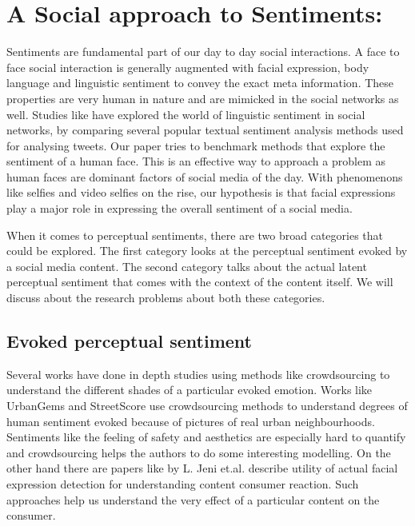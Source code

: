 \section{ A Social approach to Sentiments: }
Sentiments are fundamental part of our day to day social interactions. A face to face social interaction is generally augmented with facial expression, body language and linguistic sentiment to convey the exact meta information. These properties are very human in nature and are mimicked in the social networks as well. Studies like \cite{Joo2014b} have explored the world of linguistic sentiment in social networks, by comparing several popular textual sentiment analysis methods used for analysing tweets. Our paper tries to benchmark methods that explore the sentiment of a human face. This is an effective way to approach a problem as human faces are dominant factors of social media of the day. With phenomenons like selfies and video selfies on the rise, our hypothesis is that facial expressions play a major role in expressing the overall sentiment of a social media. 
\par
When it comes to perceptual sentiments, there are two broad categories that could be explored. The first category looks at the perceptual sentiment evoked by a social media content. The second category talks about the actual latent perceptual sentiment that comes with the context of the content itself. We will discuss about the research problems about both these categories.

\subsection{ Evoked perceptual sentiment }
Several works have done in depth studies using methods like crowdsourcing to understand the different shades of a particular evoked emotion. Works like UrbanGems \cite{urbanGems} and StreetScore \cite{nikhil} use crowdsourcing methods to understand degrees of human sentiment evoked because of pictures of real urban neighbourhoods. Sentiments like the feeling of safety and aesthetics are especially hard to quantify and crowdsourcing helps the authors to do some interesting modelling. On the other hand there are papers like \cite{jeni20123d} by L. Jeni et.al. describe utility of actual facial expression detection for understanding content consumer reaction. Such approaches help us understand the very effect of a particular content on the consumer. 

